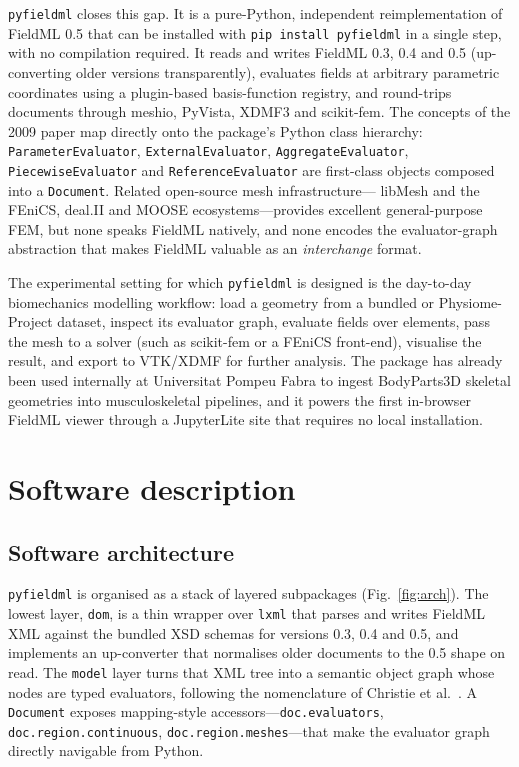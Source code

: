 \documentclass[preprint,12pt,a4paper]{elsarticle}
\begin{document}
\texttt{pyfieldml} closes this gap. It is a pure-Python, independent reimplementation of FieldML 0.5 that can be installed with \texttt{pip install pyfieldml} in a single step, with no compilation required. It reads and writes FieldML 0.3, 0.4 and 0.5 (up-converting older versions transparently), evaluates fields at arbitrary parametric coordinates using a plugin-based basis-function registry, and round-trips documents through meshio, PyVista, XDMF3 and scikit-fem. The concepts of the 2009 paper \cite{fieldml_christie_2009} map directly onto the package's Python class hierarchy: \texttt{ParameterEvaluator}, \texttt{ExternalEvaluator}, \texttt{AggregateEvaluator}, \texttt{PiecewiseEvaluator} and \texttt{ReferenceEvaluator} are first-class objects composed into a \texttt{Document}. Related open-source mesh infrastructure--- libMesh \cite{kirk_libmesh_2006} and the FEniCS, deal.II and MOOSE ecosystems---provides excellent general-purpose FEM, but none speaks FieldML natively, and none encodes the evaluator-graph abstraction that makes FieldML valuable as an \emph{interchange} format.

The experimental setting for which \texttt{pyfieldml} is designed is the day-to-day biomechanics modelling workflow: load a geometry from a bundled or Physiome-Project dataset, inspect its evaluator graph, evaluate fields over elements, pass the mesh to a solver (such as scikit-fem or a FEniCS front-end), visualise the result, and export to VTK/XDMF for further analysis. The package has already been used internally at Universitat Pompeu Fabra to ingest BodyParts3D \cite{bodyparts3d} skeletal geometries into musculoskeletal pipelines, and it powers the first in-browser FieldML viewer through a JupyterLite \cite{jupyterlite} site that requires no local installation.

\section{Software description}

\subsection{Software architecture}

\texttt{pyfieldml} is organised as a stack of layered subpackages (Fig.~\ref{fig:arch}). The lowest layer, \texttt{dom}, is a thin wrapper over \texttt{lxml} \cite{lxml} that parses and writes FieldML XML against the bundled XSD schemas for versions 0.3, 0.4 and 0.5, and implements an up-converter that normalises older documents to the 0.5 shape on read. The \texttt{model} layer turns that XML tree into a semantic object graph whose nodes are typed evaluators, following the nomenclature of Christie et al.~\cite{fieldml_christie_2009}. A \texttt{Document} exposes mapping-style accessors---\texttt{doc.evaluators}, \texttt{doc.region.continuous}, \texttt{doc.region.meshes}---that make the evaluator graph directly navigable from Python.
\end{document}

